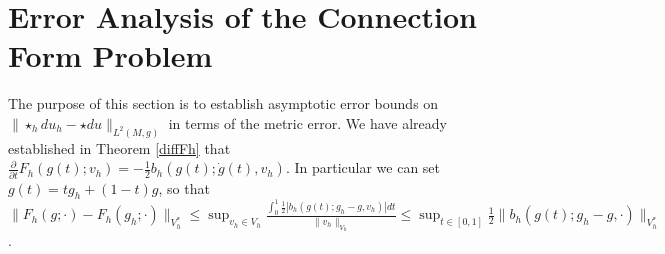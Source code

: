 \documentclass[11pt]{article}
\newcommand{\pdiff}[2]{\frac{\partial #1}{\partial #2}}
\begin{document}
\section{Error Analysis of the Connection Form Problem}
The purpose of this section is to establish asymptotic error bounds on \\$\|\star_h du_h - \star du\|_{L^2(M,g)}$ in terms of the metric error. We have already established in Theorem \ref{diffFh} that $\pdiff{}{t}F_h(g(t);v_h) = -\frac{1}{2}b_h(g(t);\dot g(t), v_h)$. In particular we can set $g(t) = tg_h + (1-t)g$, so that \\$\|F_h(g;\cdot) - F_h(g_h;\cdot)\|_{V_h^*} \le \sup_{v_h \in V_h}\frac{\int_0^1 \frac{1}{2}|b_h(g(t);g_h - g,v_h)| dt}{\|v_h\|_{V_h}} \le \sup_{t \in [0,1]} \frac{1}{2}\|b_h(g(t);g_h - g,\cdot)\|_{V_h^*}$.
\end{document}
